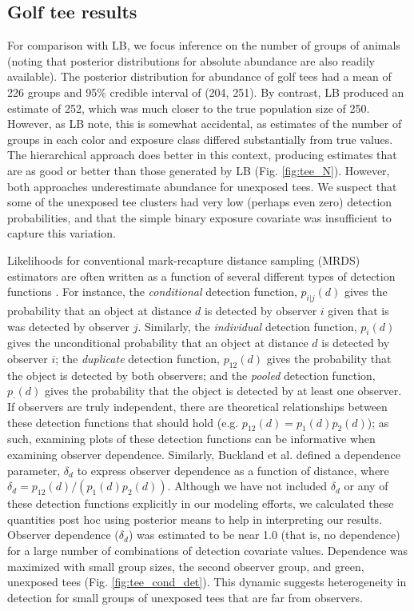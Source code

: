 \documentclass[10pt]{article}
\begin{document}
\subsection*{Golf tee results}

For comparison with LB, we focus inference on the number of groups of animals (noting that posterior distributions for absolute abundance are also readily available).  The posterior distribution for abundance of golf tees had a mean of 226 groups and 95\% credible interval of (204, 251).  By contrast, LB produced an estimate of 252, which was much closer to the true population size of 250.  However, as LB note, this is somewhat accidental, as estimates of the number of groups in each
color and exposure class differed substantially from true values.  The hierarchical approach does better in this context, producing estimates that are as good or better than those generated by LB (Fig. \ref{fig:tee_N}).  However, both approaches underestimate abundance for unexposed tees.  We suspect that some of the unexposed tee clusters had very low (perhaps even zero) detection probabilities, and that the simple binary exposure covariate was insufficient to capture this variation.

Likelihoods for conventional mark-recapture distance sampling (MRDS) estimators are often written as a function of several different types of detection functions \cite{LaakeBorchers2004}.  For instance, the {\it conditional} detection function, $p_{i|j}(d)$ gives the probability that an object at distance $d$ is detected by observer $i$ given that is was detected by observer $j$. Similarly, the {\it individual} detection function, $p_i(d)$ gives the unconditional probability that an object at distance $d$ is detected by observer $i$; the {\it duplicate} detection function, $p_{12}(d)$ gives the probability that the object is detected by both observers; and the {\it pooled} detection function, $p_\cdot(d)$ gives the probability that the object is detected by at least one observer.  If observers are truly independent, there are theoretical relationships between these detection functions that should hold (e.g. $p_{12}(d)=p_1(d)p_2(d)$); as such, examining plots of these detection functions can be informative when examining observer dependence.  Similarly, Buckland et al. \cite{BucklandEtAl2010} defined a dependence parameter, $\delta_d$ to express observer dependence as a function of distance, where $\delta_d=p_{12}(d)/(p_1(d)p_2(d))$.  Although we have not included $\delta_d$ or any of these detection functions explicitly in our modeling efforts, we calculated these quantities post hoc using posterior means to help in interpreting our results.  Observer dependence ($\delta_d$) was estimated to be near 1.0 (that is, no dependence) for a large number of combinations of detection covariate values.  Dependence was maximized with small group sizes, the second observer group, and green, unexposed tees (Fig. \ref{fig:tee_cond_det}).  This dynamic suggests heterogeneity in detection for small groups of unexposed tees that are far from observers.
\end{document}
